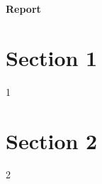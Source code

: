 \documentclass[11pt,a4paper,english]{article}
\begin{document}
    {\centering\huge\textbf{Report}\par}

    \vspace{1cm}

    \section*{Section 1}
    1

    \section*{Section 2}
    2
\end{document}
